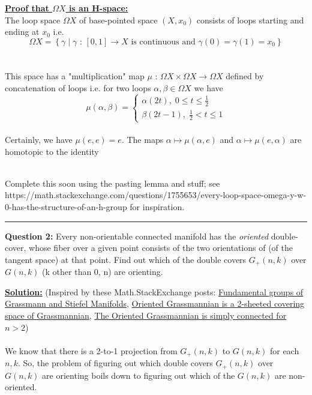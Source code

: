 \documentclass[11pt]{article}
\begin{document}
\begin{dottedbox}
  \underline{\textbf{Proof that $\Omega X$ is an H-space:}}
  \\
  The loop space $\Omega X$ of base-pointed space $(X, x_0)$ consists of loops starting and ending at $x_0$ i.e. $$ \Omega X = \left\{ \gamma \; | \; \gamma \text{ : } [0, 1] \rightarrow X \text{ is continuous and } \gamma(0) = \gamma(1) = x_0 \right\} $$
  \\
  \\
  This space has a "multiplication" map $\mu \text{ : } \Omega X \times \Omega X \rightarrow \Omega X$ defined by concatenation of loops i.e. for two loops $\alpha, \beta \in \Omega X$ we have $$ \mu(\alpha, \beta) = \begin{cases}
    \alpha(2t), \; 0 \leq t \leq \frac{1}{2} \\
    \beta(2t - 1), \; \frac{1}{2} < t \leq 1
  \end{cases}  $$
  \\
  Certainly, we have $\mu(e, e) = e$. The maps $\alpha \mapsto \mu(\alpha, e)$ and $\alpha \mapsto \mu(e, \alpha)$ are homotopic to the identity
  \\
  \\
  \begin{note}
    {Complete this soon using the pasting lemma and stuff; see https://math.stackexchange.com/questions/1755653/every-loop-space-omega-y-w-0-has-the-structure-of-an-h-group for inspiration.}
  \end{note}
\end{dottedbox}

\vskip 0.5cm
\hrule
\pagebreak



\begin{bluebox}
  \textbf{Question 2:} Every non-orientable connected manifold has the \textit{oriented} double-cover, whose fiber over a given point consists of the two orientations of (of the tangent space) at that point. Find out which of the double covers $G_{+}(n, k)$ over $G(n, k)$ (k other than 0, n) are orienting.
\end{bluebox}

\vskip 0.5cm
\textbf{\underline{Solution:}} (Inspired by these Math.StackExchange posts: \href{https://math.stackexchange.com/questions/69533/fundamental-groups-of-grassmann-and-stiefel-manifolds}{Fundamental groups of Grassmann and Stiefel Manifolds}, \href{https://math.stackexchange.com/questions/3791207/oriented-grassmann-is-a-2-sheeted-covering-space-of-grassmann}{Oriented Grassmannian is a 2-sheeted covering space of Grassmannian}, \href{https://math.stackexchange.com/questions/1610645/the-oriented-grassmannian-widetilde-textgrk-mathbbrn-is-simply-conn}{The Oriented Grassmannian is simply connected for $n > 2$})
\\
\\
We know that there is a 2-to-1 projection from $G_+(n, k)$ to $G(n,k)$ for each $n, k$. So, the problem of figuring out which double covers $G_+(n,k)$ over $G(n,k)$ are orienting boils down to figuring out which of the $G(n,k)$ are non-oriented.
\end{document}
